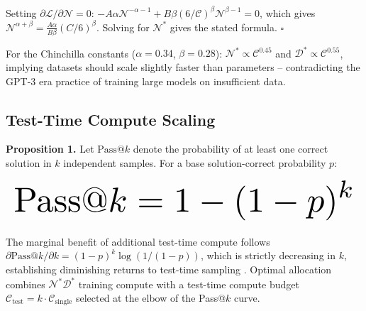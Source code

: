 \documentclass[10pt,twocolumn,letterpaper]{article}
\begin{document}
Setting $\partial\mathcal{L}/\partial\mathcal{N} = 0$: $-A\alpha\mathcal{N}^{-\alpha-1} + B\beta(6/\mathcal{C})^\beta\mathcal{N}^{\beta-1} = 0$, which gives $\mathcal{N}^{\alpha+\beta} = \frac{A\alpha}{B\beta}(C/6)^\beta$. Solving for $\mathcal{N}^*$ gives the stated formula. $\square$

For the Chinchilla constants ($\alpha = 0.34$, $\beta = 0.28$): $\mathcal{N}^* \propto \mathcal{C}^{0.45}$ and $\mathcal{D}^* \propto \mathcal{C}^{0.55}$, implying datasets should scale slightly faster than parameters -- contradicting the GPT-3 era practice of training large models on insufficient data.


\subsection{Test-Time Compute Scaling}


\textbf{Proposition 1.} Let $\text{Pass@}k$ denote the probability of at least one correct solution in $k$ independent samples. For a base solution-correct probability $p$:























\begin{equation}
\resizebox{\columnwidth}{!}{$\displaystyle
\begin{aligned}
\text{Pass@}k = 1 - (1-p)^k
\end{aligned}
$}
\end{equation}























The marginal benefit of additional test-time compute follows $\partial\text{Pass@}k/\partial k = (1-p)^k \log(1/(1-p))$, which is strictly decreasing in $k$, establishing diminishing returns to test-time sampling \cite{arxiv_2203_11171}. Optimal allocation combines $\mathcal{N}^*\mathcal{D}^*$ training compute with a test-time compute budget $\mathcal{C}_{\text{test}} = k \cdot \mathcal{C}_{\text{single}}$ selected at the elbow of the Pass@$k$ curve.
\end{document}
